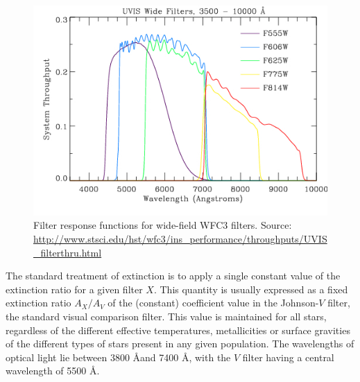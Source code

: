 \documentclass[12pt, a4paper]{report}
\begin{document}
\begin{figure}[h]
\begin{center}
\includegraphics[width=1.0\textwidth]{UVIS_Wide2.jpg}
\caption{Filter response functions for wide-field WFC3 filters. Source: \protect\url{http://www.stsci.edu/hst/wfc3/ins_performance/throughputs/UVIS_filterthru.html}}
\label{WFC3_response_funcs2}
\end{center}
\end{figure}

The standard treatment of extinction is to apply a single constant value of the extinction ratio for a given filter $X$. This quantity is usually expressed as a fixed extinction ratio $A_{X}/A_{V}$ of the (constant) coefficient value in the Johnson-$V$ filter, the standard visual comparison filter. This value is maintained for all stars, regardless of the different effective temperatures, metallicities or surface gravities of the different types of stars present in any given population. The wavelengths of optical light lie between 3800 \AA and 7400 \AA, with the $V$ filter having a central wavelength of 5500 \AA.
\end{document}

